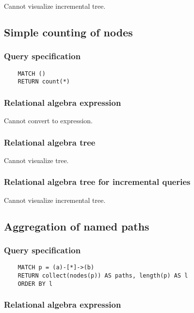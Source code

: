 	Cannot visualize incremental tree.
	\subsection{Simple counting of nodes}

	\subsubsection*{Query specification}

	\begin{lstlisting}
	MATCH ()
	RETURN count(*)
	\end{lstlisting}


	\subsubsection*{Relational algebra expression}

	Cannot convert to expression.

	\subsubsection*{Relational algebra tree}

	Cannot visualize tree.

	\subsubsection*{Relational algebra tree for incremental queries}

	Cannot visualize incremental tree.
	\subsection{Aggregation of named paths}

	\subsubsection*{Query specification}

	\begin{lstlisting}
	MATCH p = (a)-[*]->(b)
	RETURN collect(nodes(p)) AS paths, length(p) AS l
	ORDER BY l
	\end{lstlisting}


	\subsubsection*{Relational algebra expression}


